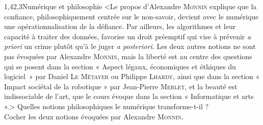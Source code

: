 \begin{quiz}[title={Web et usages}]
\begin{quizquestion}[c]{1,4}{2,3}{Numérique et philosophie}
<Le propos d'Alexandre \textsc{Monnin} explique que la confiance, philosophiquement centrée sur le non-savoir, devient avec le numérique une opérationnalisation de la défiance. Par ailleurs, les algo\-rithmes et leur capacité à traiter des données, favorise un droit préemptif qui vise à prévenir \textit{a priori} un crime plutôt qu'à le juger \textit{a posteriori}. Les deux autres notions ne sont pas évoquées par Alexandre \textsc{Monnin}, mais la liberté est au centre des questions qui se posent dans la section « Aspect légaux, économiques et éthiques du logiciel~» par Daniel \textsc{Le Métayer} ou Philippe \textsc{Lhardy}, ainsi que dans la section « Impact sociétal de la robotique » par Jean-Pierre \textsc{Merlet}, et la beauté est indissociable de l'art, que le cours évoque dans la section « Informatique et arts ».>
Quelles notions philosophiques le numérique transforme-t-il ?\\
Cocher les deux notions évoquées par Alexandre \textsc{Monnin}.
\end{quizquestion}

\end{quiz}


\vfill\pagebreak\thispagestyle{empty}
